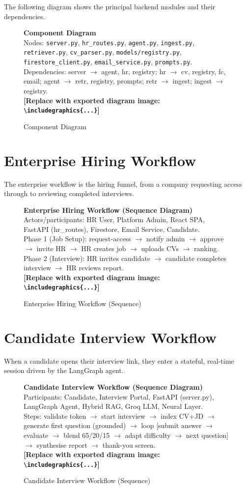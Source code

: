 \documentclass[12pt,a4paper,oneside]{report}
\newcommand{\diagramplaceholder}[1]{%
  \begin{tcolorbox}[
    colback=gray!5, colframe=gray!50,
    boxrule=0.4pt, arc=2pt,
    left=10pt, right=10pt, top=8pt, bottom=8pt,
    fontupper=\small\itshape
  ]
  \centering #1\\[4pt]
  \textbf{[Replace with exported diagram image: \texttt{\textbackslash includegraphics\{...\}}]}
  \end{tcolorbox}%
}
\begin{document}
The following diagram shows the principal backend modules and their dependencies.

\begin{figure}[H]
\centering
\diagramplaceholder{%
  \textbf{Component Diagram}\\
  Nodes: \texttt{server.py}, \texttt{hr\_routes.py}, \texttt{agent.py}, \texttt{ingest.py},
  \texttt{retriever.py}, \texttt{cv\_parser.py}, \texttt{models/registry.py},
  \texttt{firestore\_client.py}, \texttt{email\_service.py}, \texttt{prompts.py}.\\
  Dependencies: server $\to$ agent, hr, registry; hr $\to$ cv, registry, fc, email;
  agent $\to$ retr, registry, prompts; retr $\to$ ingest; ingest $\to$ registry.%
}
\caption{Component Diagram}
\label{fig:component}
\end{figure}

\section{Enterprise Hiring Workflow}

The enterprise workflow is the hiring funnel, from a company requesting access through to
reviewing completed interviews.

\begin{figure}[H]
\centering
\diagramplaceholder{%
  \textbf{Enterprise Hiring Workflow (Sequence Diagram)}\\
  Actors/participants: HR User, Platform Admin, React SPA, FastAPI (hr\_routes), Firestore, Email Service, Candidate.\\
  Phase 1 (Job Setup): request-access $\to$ notify admin $\to$ approve $\to$ invite HR $\to$ HR creates job $\to$ uploads CVs $\to$ ranking.\\
  Phase 2 (Interview): HR invites candidate $\to$ candidate completes interview $\to$ HR reviews report.%
}
\caption{Enterprise Hiring Workflow (Sequence)}
\label{fig:entseq}
\end{figure}

\section{Candidate Interview Workflow}

When a candidate opens their interview link, they enter a stateful, real-time session driven
by the LangGraph agent.

\begin{figure}[H]
\centering
\diagramplaceholder{%
  \textbf{Candidate Interview Workflow (Sequence Diagram)}\\
  Participants: Candidate, Interview Portal, FastAPI (server.py), LangGraph Agent, Hybrid RAG, Groq LLM, Neural Layer.\\
  Steps: validate token $\to$ start interview $\to$ index CV+JD $\to$ generate first question (grounded) $\to$
  loop [submit answer $\to$ evaluate $\to$ blend 65/20/15 $\to$ adapt difficulty $\to$ next question] $\to$
  synthesise report $\to$ thank-you screen.%
}
\caption{Candidate Interview Workflow (Sequence)}
\label{fig:candseq}
\end{figure}
\end{document}

